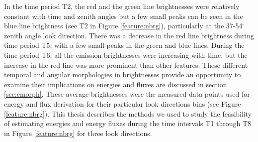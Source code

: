 \documentclass[crop=false,class=mitthesis,oneside,font=12pt]{standalone}
\begin{document}
In the time period T2, the red and the green line brightnesses were relatively constant with time and zenith angles but a few small peaks can be seen in the blue line brightness (see T2 in Figure \ref{feature:nbrg}), particularly at the 37-54$^\circ$ zenith angle look direction. 
There was a decrease in the red line brightness during time period T5, with a few small peaks in the green and blue lines. During the time period T6, all the emission brightnesses were increasing with time, but the increase in the red line was more prominent than other features. These different temporal and angular morphologies in brightnesses provide an opportunity to examine their implications on energies and fluxes are discussed in section \ref{sec:emorph}. These average brightnesses were the measured data points used for energy and flux derivation for their particular look directions bins (see Figure \ref{feature:nbrg}). This thesis describes the methods we used to study the feasibility of estimating energies and energy fluxes during the time intervals T1 through T8 in Figure \ref{feature:nbrg} for three look directions. 

\end{document}
